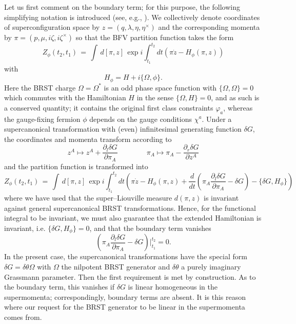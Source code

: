 \documentclass[a4paper,10pt]{article}
\begin{document}
Let us first comment on the boundary term; for this purpose,  
the following simplifying notation is introduced (see, e.g., \cite{Dewi 84}). We 
collectively denote coordinates of  superconfiguration space by 
$z=(q,\lambda,\eta,\eta^{\times})$ and the corresponding momenta by 
$\pi=(p,\mu,i\zeta,i\zeta^{\times})$ so that the BFV partition function takes the form
\begin{equation}
Z_{\phi}(t_2,t_1)\,=\,\int\,d[\pi,z]\,\exp i\int_{t_1}^{t_2}dt(\pi\dot{z}-
H_{\phi}(\pi,z))
\end{equation}
with
\begin{equation}
H_{\phi}=H+i\{\Omega,\phi\}. 
\end{equation}
Here the BRST charge $\Omega=\Omega^{\ast}$ is an odd phase space function with 
$\{\Omega,\Omega\}=0$ which commutes with the Hamiltonian $H$ in the sense 
$\{\Omega,H\}=0$, and as such is a conserved quantity; it contains the original first 
class constraints $\varphi_a$, whereas the gauge-fixing fermion $\phi$ depends on the 
gauge conditions $\chi^a$. Under a supercanonical transformation with (even) 
infinitesimal generating function $\delta G$, the coordinates and momenta transform 
according to 
\begin{equation}
z^A\mapsto z^{A}+\frac{\partial_l\delta G }{\partial\pi_A}\qquad\qquad \pi_A\mapsto\pi_A-
\frac{\partial_r\delta G}{\partial z^A}
\end{equation}
and the partition function is transformed into
\begin{equation}
Z_{\phi}(t_2,t_1)\,=\,\int\,d[\pi,z]\,\exp i\int_{t_1}^{t_2}dt\left(\pi\dot{z}-
H_{\phi}(\pi,z)+\frac{d}{dt}(\pi_A\frac{\partial_l\delta G}{\partial\pi_A}-\delta G)-
\{\delta G,H_{\phi}\}\right)
\end{equation}
where we have used that the super--Liouville measure $d(\pi,z)$ is invariant against general supercanonical BRST transformations. Hence, for the functional integral to be invariant, we must also guarantee that the extended Hamiltonian is invariant, i.e. $\{\delta G,H_{\phi}\}=0$, and that the boundary term 
vanishes
\begin{equation}
\left(\pi_A\frac{\partial_l\delta G}{\partial\pi_A}-\delta G\right)\Big|^{t_2}_{t_1}=0.
\end{equation}
In the present case, the supercanonical transformations have the special form $\delta 
G=\delta\theta \Omega$ with $\Omega$ the nilpotent BRST generator and $\delta\theta$ a 
purely imaginary Grassmann parameter. Then the first requirement is met by construction. 
As to the boundary term, this vanishes if $\delta G$ is linear 
homogeneous in the supermomenta; correspondingly, boundary terms are absent. It is this reason where our request for the BRST generator to be linear in the supermomenta comes from.
\end{document}
